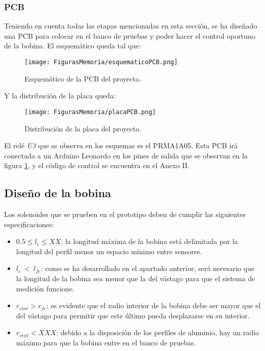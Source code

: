 \newpage
\subsubsection*{PCB}

Teniendo en cuenta todas las etapas mencionadas en esta sección, se ha diseñado una PCB para colocar en el banco de pruebas y poder hacer el control oportuno de la bobina. El esquemático queda tal que:

\begin{figure}[H]
    \centering
    \texttt{[image: FigurasMemoria/esquematicoPCB.png]}
    \caption{Esquemático de la PCB del proyecto.}
    \label{fig:esquematicoPCB} %
\end{figure}

\noindent Y la distribución de la placa queda:

\begin{figure}[H]
    \centering
    \texttt{[image: FigurasMemoria/placaPCB.png]}
    \caption{Distribución de la placa del proyecto.}
    \label{fig:placaPCB} %
\end{figure}

El relé \textit{U3} que se observa en los esquemas es el PRMA1A05. Esta PCB irá conectada a un Arduino Leonardo en los pines de salida que se observan en la figura \ref{fig:esquematicoPCB}, y el código de control se encuentra en el Anexo II.

\subsection{Diseño de la bobina}
\label{subsec:bobina}

Los solenoides que se prueben en el prototipo deben de cumplir las siguientes especificaciones:

\begin{itemize}
    \item \(0.5\leq l_{c} \leq XX\): la longitud máxima de la bobina está delimitada por la longitud del perfil menos un espacio mínimo entre sensores.
    \item \(l_c~<~l_{fe}\): como se ha desarrollado en el apartado anterior, será necesario que la longitud de la bobina sea menor que la del vástago para que el sistema de medición funcione.
    \item \(r_{cint} > r_{fe}\): es evidente que el radio interior de la bobina debe ser mayor que el del vástago para permitir que este último pueda desplazarse en su interior.
    \item \(r_{cext} < XXX\): debido a la disposición de los perfiles de aluminio, hay un radio máximo para que la bobina entre en el banco de pruebas.
\end{itemize}

